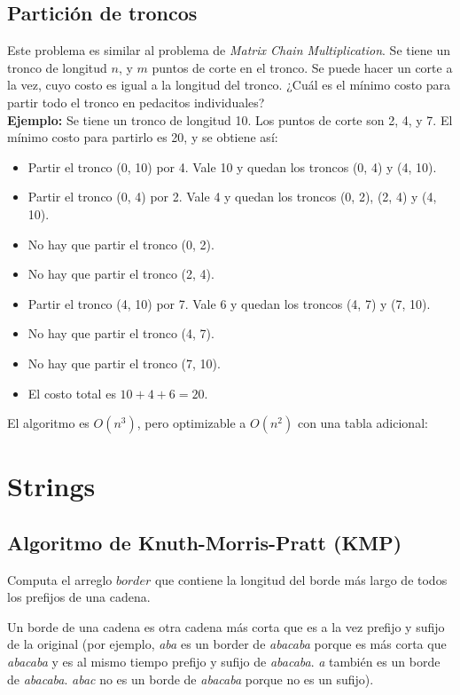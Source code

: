 \documentclass[10pt,letterpaper,twocolumn]{article}
\newcommand{\codigofuente}[1]{

\dotfill
}
\begin{document}
\subsection{Partición de troncos}
Este problema es similar al problema de \textit{Matrix Chain Multiplication}. Se tiene
un tronco de longitud $n$, y $m$ puntos de corte en el tronco. Se puede hacer un corte a la vez,
cuyo costo es igual a la longitud del tronco. ¿Cuál es el mínimo costo para partir todo el tronco
en pedacitos individuales?
\\
\medskip
\textbf{Ejemplo:} Se tiene un tronco de longitud 10. Los puntos de corte son 2, 4, y 7. El mínimo
costo para partirlo es 20, y se obtiene así:
\begin{itemize}
\item Partir el tronco (0, 10) por 4. Vale 10 y quedan los troncos (0, 4) y (4, 10).
\item Partir el tronco (0, 4) por 2. Vale 4 y quedan los troncos (0, 2), (2, 4) y (4, 10).
\item No hay que partir el tronco (0, 2).
\item No hay que partir el tronco (2, 4).
\item Partir el tronco (4, 10) por 7. Vale 6 y quedan los troncos (4, 7) y (7, 10).
\item No hay que partir el tronco (4, 7).
\item No hay que partir el tronco (7, 10).
\item El costo total es $10+4+6 = 20$.
\end{itemize}

\medskip
El algoritmo es $O(n^3)$, pero optimizable a $O(n^2)$ con una tabla adicional:
\codigofuente{./src/dp/particion_troncos.cpp}

\section{Strings}
\subsection{Algoritmo de Knuth-Morris-Pratt (KMP)}

Computa el arreglo $border$ que contiene la longitud del borde más largo de todos
los prefijos de una cadena.

Un borde de una cadena es otra cadena más corta que es a la vez prefijo y sufijo de la original
(por ejemplo, \textit{aba} es un border de \textit{abacaba} porque es más corta que \textit{abacaba}
y es al mismo tiempo prefijo y sufijo de \textit{abacaba}. \textit{a} también es un borde de \textit{abacaba}.
\textit{abac} no es un borde de \textit{abacaba} porque no es un sufijo).
\end{document}
